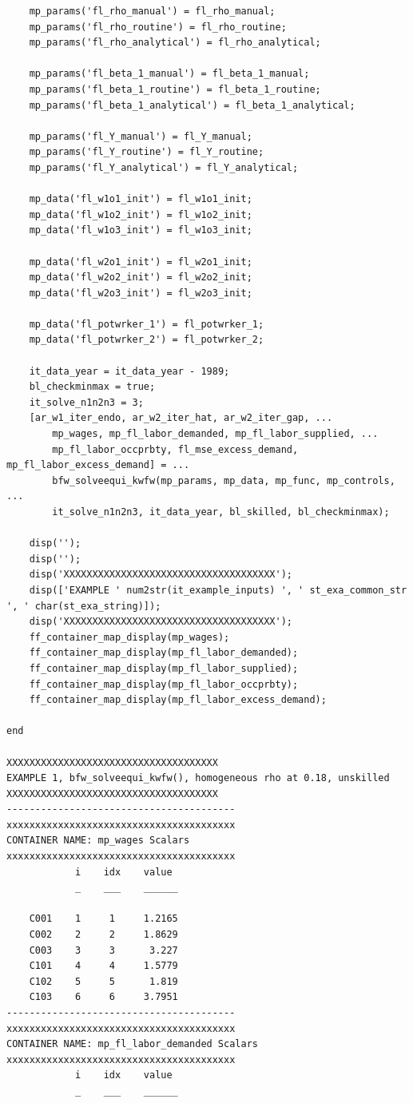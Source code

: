 \documentclass[
]{book}
\begin{document}
\begin{verbatim}
    mp_params('fl_rho_manual') = fl_rho_manual;
    mp_params('fl_rho_routine') = fl_rho_routine;
    mp_params('fl_rho_analytical') = fl_rho_analytical;

    mp_params('fl_beta_1_manual') = fl_beta_1_manual;
    mp_params('fl_beta_1_routine') = fl_beta_1_routine;
    mp_params('fl_beta_1_analytical') = fl_beta_1_analytical;

    mp_params('fl_Y_manual') = fl_Y_manual;
    mp_params('fl_Y_routine') = fl_Y_routine;
    mp_params('fl_Y_analytical') = fl_Y_analytical;

    mp_data('fl_w1o1_init') = fl_w1o1_init;
    mp_data('fl_w1o2_init') = fl_w1o2_init;
    mp_data('fl_w1o3_init') = fl_w1o3_init;

    mp_data('fl_w2o1_init') = fl_w2o1_init;
    mp_data('fl_w2o2_init') = fl_w2o2_init;
    mp_data('fl_w2o3_init') = fl_w2o3_init;

    mp_data('fl_potwrker_1') = fl_potwrker_1;
    mp_data('fl_potwrker_2') = fl_potwrker_2;

    it_data_year = it_data_year - 1989;
    bl_checkminmax = true;
    it_solve_n1n2n3 = 3;
    [ar_w1_iter_endo, ar_w2_iter_hat, ar_w2_iter_gap, ...
        mp_wages, mp_fl_labor_demanded, mp_fl_labor_supplied, ...
        mp_fl_labor_occprbty, fl_mse_excess_demand, mp_fl_labor_excess_demand] = ...
        bfw_solveequi_kwfw(mp_params, mp_data, mp_func, mp_controls, ...
        it_solve_n1n2n3, it_data_year, bl_skilled, bl_checkminmax);

    disp('');
    disp('');
    disp('XXXXXXXXXXXXXXXXXXXXXXXXXXXXXXXXXXXXX');
    disp(['EXAMPLE ' num2str(it_example_inputs) ', ' st_exa_common_str ', ' char(st_exa_string)]);
    disp('XXXXXXXXXXXXXXXXXXXXXXXXXXXXXXXXXXXXX');
    ff_container_map_display(mp_wages);
    ff_container_map_display(mp_fl_labor_demanded);
    ff_container_map_display(mp_fl_labor_supplied);
    ff_container_map_display(mp_fl_labor_occprbty);
    ff_container_map_display(mp_fl_labor_excess_demand);

end

XXXXXXXXXXXXXXXXXXXXXXXXXXXXXXXXXXXXX
EXAMPLE 1, bfw_solveequi_kwfw(), homogeneous rho at 0.18, unskilled
XXXXXXXXXXXXXXXXXXXXXXXXXXXXXXXXXXXXX
----------------------------------------
xxxxxxxxxxxxxxxxxxxxxxxxxxxxxxxxxxxxxxxx
CONTAINER NAME: mp_wages Scalars
xxxxxxxxxxxxxxxxxxxxxxxxxxxxxxxxxxxxxxxx
            i    idx    value 
            _    ___    ______

    C001    1     1     1.2165
    C002    2     2     1.8629
    C003    3     3      3.227
    C101    4     4     1.5779
    C102    5     5      1.819
    C103    6     6     3.7951
----------------------------------------
xxxxxxxxxxxxxxxxxxxxxxxxxxxxxxxxxxxxxxxx
CONTAINER NAME: mp_fl_labor_demanded Scalars
xxxxxxxxxxxxxxxxxxxxxxxxxxxxxxxxxxxxxxxx
            i    idx    value 
            _    ___    ______


\end{verbatim}
\end{document}
